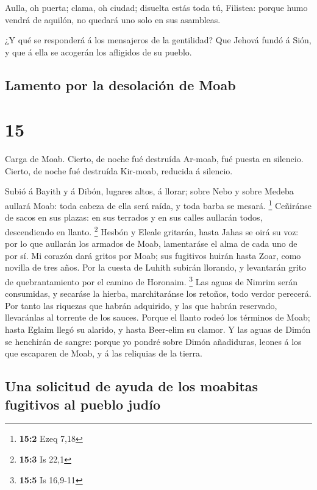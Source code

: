  Aulla, oh puerta; clama, oh ciudad; disuelta estás toda
tú, Filistea: porque humo vendrá de aquilón, no quedará uno solo en sus
asambleas.

 ¿Y qué se responderá á los mensajeros de la gentilidad?
Que Jehová fundó á Sión, y que á ella se acogerán los afligidos de su
pueblo.

\hypertarget{lamento-por-la-desolaciuxf3n-de-moab}{%
\subsection{Lamento por la desolación de
Moab}\label{lamento-por-la-desolaciuxf3n-de-moab}}

\hypertarget{section-14}{%
\section{15}\label{section-14}}

 Carga de Moab. Cierto, de noche fué destruída Ar-moab,
fué puesta en silencio. Cierto, de noche fué destruída Kir-moab,
reducida á silencio.

 Subió á Bayith y á Dibón, lugares altos, á llorar; sobre
Nebo y sobre Medeba aullará Moab: toda cabeza de ella será raída, y toda
barba se mesará. \footnote{\textbf{15:2} Ezeq 7,18} 
Ceñiránse de sacos en sus plazas: en sus terrados y en sus calles
aullarán todos, descendiendo en llanto. \footnote{\textbf{15:3} Is 22,1}
 Hesbón y Eleale gritarán, hasta Jahas se oirá su voz: por
lo que aullarán los armados de Moab, lamentaráse el alma de cada uno de
por sí.  Mi corazón dará gritos por Moab; sus fugitivos
huirán hasta Zoar, como novilla de tres años. Por la cuesta de Luhith
subirán llorando, y levantarán grito de quebrantamiento por el camino de
Horonaim. \footnote{\textbf{15:5} Is 16,9-11}  Las aguas
de Nimrim serán consumidas, y secaráse la hierba, marchitaránse los
retoños, todo verdor perecerá.  Por tanto las riquezas que
habrán adquirido, y las que habrán reservado, llevaránlas al torrente de
los sauces.  Porque el llanto rodeó los términos de Moab;
hasta Eglaim llegó su alarido, y hasta Beer-elim su clamor.
 Y las aguas de Dimón se henchirán de sangre: porque yo
pondré sobre Dimón añadiduras, leones á los que escaparen de Moab, y á
las reliquias de la tierra.

\hypertarget{una-solicitud-de-ayuda-de-los-moabitas-fugitivos-al-pueblo-juduxedo}{%
\subsection{Una solicitud de ayuda de los moabitas fugitivos al pueblo
judío}\label{una-solicitud-de-ayuda-de-los-moabitas-fugitivos-al-pueblo-juduxedo}}


